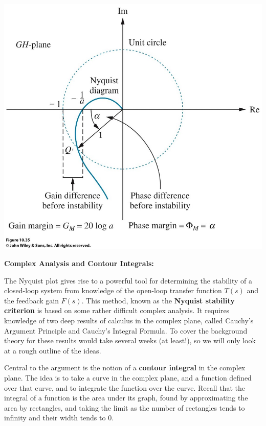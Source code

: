 \documentclass{article}
\begin{document}
\begin{center}
\includegraphics{NyquistGainPhase.jpg}
\end{center}



\clearpage



\textbf{Complex Analysis and Contour Integrals:}\bigskip



The Nyquist plot gives rise to a powerful tool for determining the stability of a closed-loop system from knowledge of the open-loop transfer function $T(s)$ and the feedback gain $F(s)$. This method, known as the \textbf{Nyquist stability criterion} is based on some rather difficult complex analysis. It requires knowledge of two deep results of calculus in the complex plane, called Cauchy's Argument Principle and Cauchy's Integral Formula. To cover the background theory for these results would take several weeks (at least!), so we will only look at a rough outline of the ideas.

Central to the argument is the notion of a \textbf{contour integral} in the complex plane. The idea is to take a curve in the complex plane, and a function defined over that curve, and to integrate the function over the curve. Recall that the integral of a function is the area under its graph, found by approximating the area by rectangles, and taking the limit as the number of rectangles tends to infinity and their width tends to 0.
\end{document}
